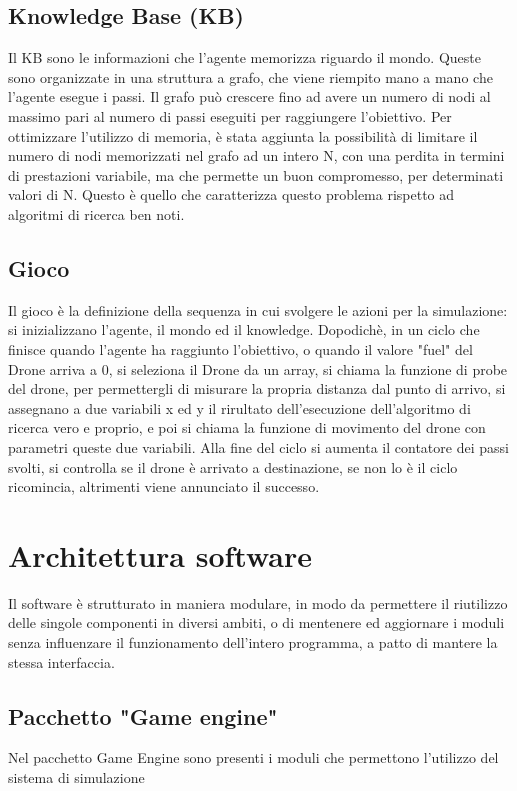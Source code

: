 \subsection{Knowledge Base (KB)}
Il KB sono le informazioni che l'agente memorizza riguardo il mondo. Queste sono organizzate in una struttura a grafo, che viene riempito mano a mano che l'agente esegue i passi. Il grafo può crescere fino ad avere un numero di nodi al massimo pari al numero di passi eseguiti per raggiungere l'obiettivo. Per ottimizzare l'utilizzo di memoria, è stata aggiunta la possibilità di limitare il numero di nodi memorizzati nel grafo ad un intero N, con una perdita in termini di prestazioni variabile, ma che permette un buon compromesso, per determinati valori di N. Questo è quello che caratterizza questo problema rispetto ad algoritmi di ricerca ben noti.

\subsection{Gioco}
Il gioco è la definizione della sequenza in cui svolgere le azioni per la simulazione: si inizializzano l'agente, il mondo ed il knowledge. Dopodichè, in un ciclo che finisce quando l'agente ha raggiunto l'obiettivo, o quando il valore "fuel" del Drone arriva a 0, si seleziona il Drone da un array, si chiama la funzione di probe del drone, per permettergli di misurare la propria distanza dal punto di arrivo, si assegnano a due variabili x ed y il rirultato dell'esecuzione dell'algoritmo di ricerca vero e proprio, e poi si chiama la funzione di movimento del drone con parametri queste due variabili. Alla fine del ciclo si aumenta il contatore dei passi svolti, si controlla se il drone è arrivato a destinazione, se non lo è il ciclo ricomincia, altrimenti viene annunciato il successo.

	
\section{Architettura software}
Il software è strutturato in maniera modulare, in modo da permettere il riutilizzo delle singole componenti in diversi ambiti, o di mentenere ed aggiornare i moduli senza influenzare il funzionamento dell'intero programma, a patto di mantere la stessa interfaccia.

\subsection{Pacchetto "Game engine"}
Nel pacchetto Game Engine sono presenti i moduli che permettono l'utilizzo del sistema di simulazione

